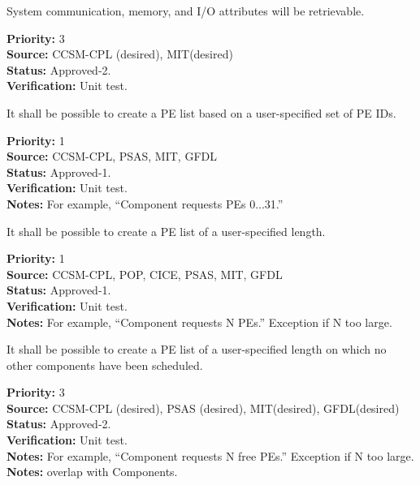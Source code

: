 System communication, memory, and I/O attributes will be retrievable.
\begin{reqlist}
{\bf Priority:} 3 \\
{\bf Source:}  CCSM-CPL (desired), MIT(desired) \\
{\bf Status:} Approved-2. \\
{\bf Verification:} Unit test.
\end{reqlist}



It shall be possible to create a PE list based on a user-specified set
of PE IDs.

\begin{reqlist}
{\bf Priority:} 1\\
{\bf Source:}  CCSM-CPL, PSAS, MIT, GFDL \\
{\bf Status:} Approved-1. \\
{\bf Verification:} Unit test. \\ 
{\bf Notes:}  For example, ``Component requests PEs 0...31.''
\end{reqlist}

It shall be possible to create a PE list of a user-specified length.

\begin{reqlist}
{\bf Priority:} 1 \\
{\bf Source:}  CCSM-CPL, POP, CICE, PSAS, MIT, GFDL \\
{\bf Status:} Approved-1. \\
{\bf Verification:} Unit test.\\ 
{\bf Notes:}  For example, ``Component requests N PEs.'' Exception if N too
  large.
\end{reqlist}

It shall be possible to create a PE list of a user-specified length
on which no other components have been scheduled.

\begin{reqlist}
  {\bf Priority:} 3 \\
  {\bf Source:}  CCSM-CPL (desired), PSAS (desired), MIT(desired), GFDL(desired)  \\
  {\bf Status:} Approved-2. \\
  {\bf Verification:} Unit test.\\
  {\bf Notes:} For example, ``Component requests N free PEs.''
  Exception if N too large.  {\bf Notes:} overlap with Components.
\end{reqlist}

